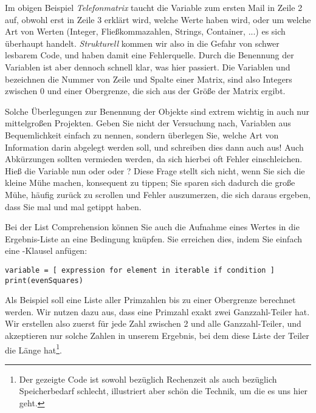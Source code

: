 \begin{hintbox}
Im obigen Beispiel \emph{Telefonmatrix} taucht die Variable  zum ersten Mail in Zeile 2 auf, obwohl erst in Zeile 3 erklärt wird, welche Werte  haben wird, oder um welche Art von Werten (Integer, Fließkommazahlen, Strings, Container, ...) es sich überhaupt handelt. \emph{Strukturell} kommen wir also in die Gefahr von schwer lesbarem Code, und haben damit eine Fehlerquelle. Durch die Benennung der Variablen ist aber dennoch schnell klar, was hier passiert. Die Variablen  und  bezeichnen die Nummer von Zeile und Spalte einer Matrix, sind also Integers zwischen 0 und einer Obergrenze, die sich aus der Größe der Matrix ergibt.

Solche Überlegungen zur Benennung der Objekte sind extrem wichtig in auch nur mittelgroßen Projekten. Geben Sie nicht der Versuchung nach, Variablen aus Bequemlichkeit einfach  zu nennen, sondern überlegen Sie, welche Art von Information darin abgelegt werden soll, und schreiben dies dann auch aus! Auch Abkürzungen sollten vermieden werden, da sich hierbei oft Fehler einschleichen. Hieß die Variable nun  oder  oder ? Diese Frage stellt sich nicht, wenn Sie sich die kleine Mühe machen, konsequent  zu tippen; Sie sparen sich dadurch die große Mühe, häufig zurück zu scrollen und Fehler auszumerzen, die sich daraus ergeben, dass Sie mal  und mal  getippt haben.
\end{hintbox}

Bei der List Comprehension können Sie auch die Aufnahme eines Wertes in die Ergebnis-Liste an eine Bedingung knüpfen. Sie erreichen dies, indem Sie einfach eine -Klausel anfügen:
\begin{codebox}
\begin{verbatim}
variable = [ expression for element in iterable if condition ]
print(evenSquares)
\end{verbatim}
\end{codebox}

Als Beispiel soll eine Liste aller Primzahlen bis zu einer Obergrenze  berechnet werden. Wir nutzen dazu aus, dass eine Primzahl exakt zwei Ganzzahl-Teiler hat. Wir erstellen also zuerst für jede Zahl zwischen 2 und  alle Ganzzahl-Teiler, und akzeptieren nur solche Zahlen in unserem Ergebnis, bei dem diese Liste der Teiler die Länge  hat\footnote{Der gezeigte Code ist sowohl bezüglich Rechenzeit als auch bezüglich Speicherbedarf schlecht, illustriert aber schön die Technik, um die es uns hier geht.}.

